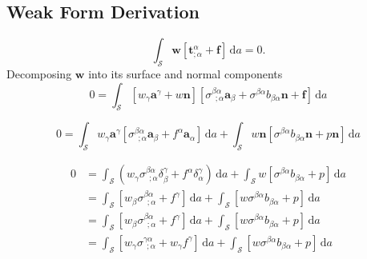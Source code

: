 \documentclass[../main.tex]{subfiles}
\begin{document}
\begin{appendices}
    \subsection{Weak Form Derivation} \label{appendices:weak_form_derivation}
    \begin{equation}\label{eq:weak_1}
        \int_{\mathcal{S}} \boldsymbol{w} \left[ \boldsymbol{t}_{; \alpha}^{\alpha} + \boldsymbol{f} \right] \, \mathrm{d} a = 0.
    \end{equation}
    Decomposing $\boldsymbol{w}$ into its surface and normal components     
    \begin{equation}\label{eq:weak_2}
        0 = \int_{\mathcal{S}} \left[ w_{\gamma} \boldsymbol{a}^{\gamma} + w \boldsymbol{n} \right] \left[ \sigma_{~~; \alpha}^{\beta \alpha} \boldsymbol{a}_{\beta} + \sigma^{\beta \alpha} b_{\beta \alpha} \boldsymbol{n} + \boldsymbol{f} \right] \, \mathrm{d} a
    \end{equation}
        
        \begin{equation}\label{eq:weak_3}
        0 = \int_{\mathcal{S}} w_{\gamma} \boldsymbol{a}^{\gamma} \left[ \sigma^{\beta \alpha}_{~~; \alpha} \boldsymbol{a}_{\beta} + f^{\alpha} \boldsymbol{a}_{\alpha} \right] \, \mathrm{d} a + \int_{\mathcal{S}} w \boldsymbol{n} \left[ \sigma^{\beta \alpha} b_{\beta \alpha} \boldsymbol{n} + p \boldsymbol{n} \right] \, \mathrm{d} a
        \end{equation}
        
        \begin{equation}\label{eq:weak_4}
        \begin{split}
                0 &= \int_{\mathcal{S}} \left( w_{\gamma} \sigma^{\beta \alpha}_{~~; \alpha} \delta^{\gamma}_{\beta} + f^{\alpha} \delta^{\gamma}_{\alpha} \right) \, \mathrm{d} a + \int_{\mathcal{S}} w \left[ \sigma^{\beta \alpha} b_{\beta \alpha} + p \right] \, \mathrm{d} a \\ &= \int_{\mathcal{S}} \left[ w_{\beta} \sigma^{\beta \alpha}_{~~; \alpha} + f^{\gamma} \right] \, \mathrm{d} a + \int_{\mathcal{S}} \left[ w \sigma^{\beta \alpha} b_{\beta \alpha} +  p \right] \, \mathrm{d} a  \\ &= \int_{\mathcal{S}} \left[ w_{\beta} \sigma^{\beta \alpha}_{~~; \alpha} + f^{\gamma} \right] \, \mathrm{d} a + \int_{\mathcal{S}} \left[ w \sigma^{\beta \alpha} b_{\beta \alpha} + p \right] \, \mathrm{d} a \\ &= \int_{\mathcal{S}} \left[ w_{\gamma} \sigma^{\gamma \alpha}_{~~; \alpha} + w_{\gamma} f^{\gamma} \right] \, \mathrm{d} a + \int_{\mathcal{S}} \left[ w \sigma^{\beta \alpha} b_{\beta \alpha} + p \right] \, \mathrm{d} a
            \end{split}
        \end{equation}
        

\end{appendices}
\end{document}
